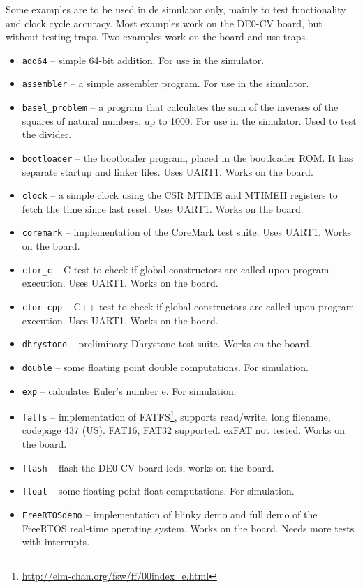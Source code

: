 \documentclass[12pt]{article}
\begin{document}
Some examples are to be used in de simulator only, mainly to test functionality and clock cycle accuracy. Most examples work on the DE0-CV board, but without testing traps. Two examples work on the board and use traps.

\begin{itemize}
\item \lstinline|add64| -- simple 64-bit addition. For use in the simulator.
\item \lstinline|assembler| -- a simple assembler program. For use in the simulator.
\item \lstinline|basel_problem| -- a program that calculates the sum of the inverses of the squares of natural numbers, up to 1000. For use in the simulator. Used to test the divider.
\item \lstinline|bootloader| -- the bootloader program, placed in the bootloader ROM. It has separate startup and linker files. Uses UART1. Works on the board.
\item \lstinline|clock| -- a simple clock using the CSR MTIME and MTIMEH registers to fetch the time since last reset. Uses UART1. Works on the board.
\item \lstinline|coremark| -- implementation of the CoreMark test suite. Uses UART1. Works on the board.
\item \lstinline|ctor_c| -- C test to check if global constructors are called upon program execution. Uses UART1. Works on the board.
\item \lstinline|ctor_cpp| -- C++ test to check if global constructors are called upon program execution. Uses UART1. Works on the board.
\item \lstinline|dhrystone| -- preliminary Dhrystone test suite. Works on the board.
\item \lstinline|double| -- some floating point double computations. For simulation.
\item \lstinline|exp| -- calculates Euler's number e. For simulation.
\item \lstinline|fatfs| -- implementation of FATFS\footnote{\url{http://elm-chan.org/fsw/ff/00index_e.html}}, supports read/write, long filename, codepage 437 (US). FAT16, FAT32 supported. exFAT not tested. Works on the board.
\item \lstinline|flash| -- flash the DE0-CV board leds, works on the board.
\item \lstinline|float| -- some floating point float computations. For simulation.
\item \lstinline|FreeRTOSdemo| -- implementation of blinky demo and full demo of the FreeRTOS real-time operating system. Works on the board. Needs more tests with interrupts.

\end{itemize}
\end{document}
